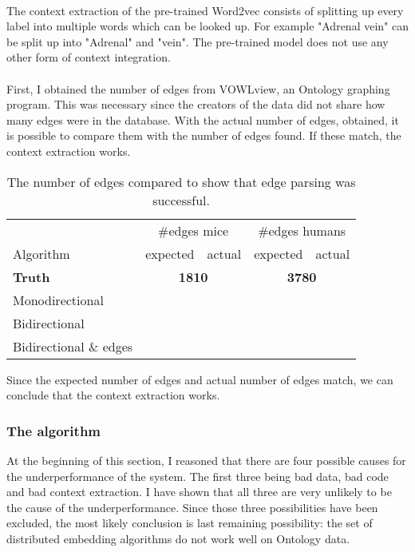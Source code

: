 \documentclass{article}
\begin{document}
  \paragraph{}
  The context extraction of the pre-trained Word2vec consists of splitting up every label into multiple words which can be looked up. For example "Adrenal vein" can be split up into "Adrenal" and "vein".
  The pre-trained model does not use any other form of context integration.
  \paragraph{}
  First, I obtained the number of edges from VOWLview\cite{vowlview}, an Ontology graphing program. This was necessary since the creators of the data did not share how many edges were in the database. With the actual number of edges, obtained, it is possible to compare them with the number of edges found. If these match, the context extraction works.
  \begin{table}[H]
  \begin{tabular}{l|ll|ll}
  & \multicolumn{2}{c}{\#edges mice} & \multicolumn{2}{c|}{\#edges humans}\\
  Algorithm & expected & actual & expected & actual\\
  \hline
  \textbf{Truth}\cite{mice_ontology} & \multicolumn{2}{c|}{\textbf{1810}} & \multicolumn{2}{c}{\textbf{3780}} \\
  Monodirectional & & & &\\
  Bidirectional & & & &\\
  Bidirectional \& edges & & & &\\
  \end{tabular}
  \caption[Edge comparison]{The number of edges compared to show that edge parsing was successful.}
  \label{edgecounts}
  \end{table}
  Since the expected number of edges and actual number of edges match, we can conclude that the context extraction works.
  
  \subsubsection{The algorithm}
  At the beginning of this section, I reasoned that there are four possible causes for the underperformance of the system. The first three being bad data, bad code and bad context extraction. I have shown that all three are very unlikely to be the cause of the underperformance. Since those three possibilities have been excluded, the most likely conclusion is last remaining possibility: the set of distributed embedding algorithms do not work well on Ontology data.
  
\end{document}
